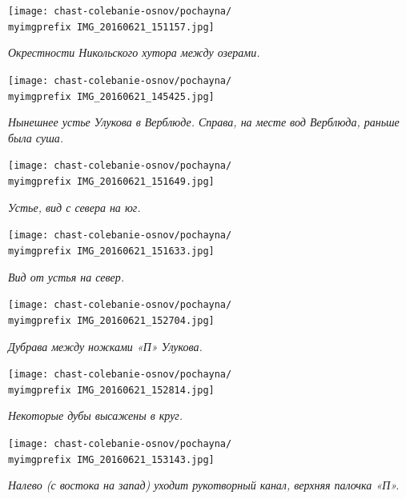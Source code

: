 \begin{center}
\texttt{[image: chast-colebanie-osnov/pochayna/\\myimgprefix IMG\_20160621\_151157.jpg]}

\textit{Окрестности Никольского хутора между озерами.}
\end{center}

\newpage

\begin{center}
\texttt{[image: chast-colebanie-osnov/pochayna/\\myimgprefix IMG\_20160621\_145425.jpg]}

\textit{Нынешнее устье Улукова в Верблюде. Справа, на месте вод Верблюда, раньше была суша.}
\end{center}

\begin{center}
\texttt{[image: chast-colebanie-osnov/pochayna/\\myimgprefix IMG\_20160621\_151649.jpg]}

\textit{Устье, вид с севера на юг.}
\end{center}

\newpage

\begin{center}
\texttt{[image: chast-colebanie-osnov/pochayna/\\myimgprefix IMG\_20160621\_151633.jpg]}

\textit{Вид от устья на север.}
\end{center}

\begin{center}
\texttt{[image: chast-colebanie-osnov/pochayna/\\myimgprefix IMG\_20160621\_152704.jpg]}

\textit{Дубрава между ножками «П» Улукова.}
\end{center}

\newpage
  
\begin{center}
\texttt{[image: chast-colebanie-osnov/pochayna/\\myimgprefix IMG\_20160621\_152814.jpg]}

\textit{Некоторые дубы высажены в круг.}
\end{center}
 
\begin{center}
\texttt{[image: chast-colebanie-osnov/pochayna/\\myimgprefix IMG\_20160621\_153143.jpg]}

\textit{Налево (с востока на запад) уходит рукотворный канал, верхняя палочка «П».}
\end{center}















